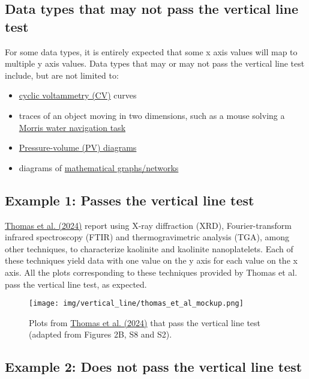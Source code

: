 \documentclass[letterpaper, 12pt]{article}
\begin{document}
\subsection*{Data types that may not pass the vertical line test}

For some data types, it is entirely expected that some x axis values will map to multiple y axis values. Data types that may or may not pass the vertical line test include, but are not limited to:

\begin{itemize}
    \setlength\itemsep{-0.5em}
    \item \href{https://en.wikipedia.org/wiki/Cyclic_voltammetry}{cyclic voltammetry (CV)} curves
    \item traces of an object moving in two dimensions, such as a mouse solving a \href{https://en.wikipedia.org/wiki/Morris_water_navigation_task}{Morris water navigation task}
    \item \href{https://en.wikipedia.org/wiki/Pressure%E2%80%93volume_diagram}{Pressure-volume (PV) diagrams}
    \item diagrams of \href{https://en.wikipedia.org/wiki/Graph_theory}{mathematical graphs/networks}
\end{itemize}

\pagebreak

\subsection*{Example 1: Passes the vertical line test}

\href{https://doi.org/10.1021/acsami.4c03997}{Thomas et al. (2024)} report using X-ray diffraction (XRD), Fourier-transform infrared spectroscopy (FTIR) and thermogravimetric analysis (TGA), among other techniques, to characterize kaolinite and kaolinite nanoplatelets. Each of these techniques yield data with one value on the y axis for each value on the x axis. All the plots corresponding to these techniques provided by Thomas et al. pass the vertical line test, as expected.

\begin{figure}[h!tbp]
    \centering
    \texttt{[image: img/vertical\_line/thomas\_et\_al\_mockup.png]}
    \caption*{Plots from \href{https://doi.org/10.1021/acsami.4c03997}{Thomas et al. (2024)} that pass the vertical line test (adapted from Figures 2B, S8 and S2).}
\end{figure}

\subsection*{Example 2: Does not pass the vertical line test}
\end{document}

